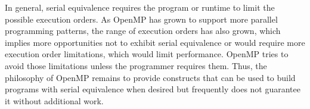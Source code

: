 In general, serial equivalence requires the program or runtime to limit the
possible execution orders. As OpenMP has grown to support more parallel
programming patterns, the range of execution orders has also grown, which
implies more opportunities not to exhibit serial equivalence or would require
more execution order limitations, which would limit performance. OpenMP tries
to avoid those limitations unless the programmer requires them. Thus, the
philosophy of OpenMP remains to provide constructs that can be used to build
programs with serial equivalence when desired but frequently does not guarantee
it without additional work.

